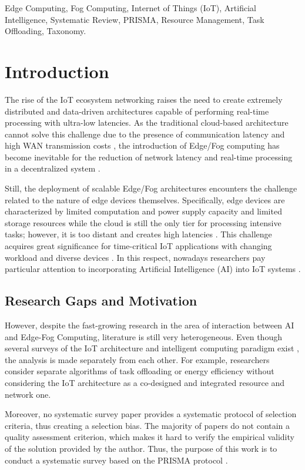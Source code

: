 \documentclass[conference]{IEEEtran}
\begin{document}
\begin{IEEEkeywords}
Edge Computing, Fog Computing, Internet of Things (IoT), Artificial Intelligence, Systematic Review, PRISMA, Resource Management, Task Offloading, Taxonomy.
\end{IEEEkeywords}

\section{Introduction}
\label{sec:intro}

The rise of the IoT ecosystem networking raises the need to create extremely distributed and data-driven architectures capable of performing real-time processing with ultra-low latencies. As the traditional cloud-based architecture cannot solve this challenge due to the presence of communication latency and high WAN transmission costs \cite{b1,b5}, the introduction of Edge/Fog computing has become inevitable for the reduction of network latency and real-time processing in a decentralized system \cite{b22,b23}.

Still, the deployment of scalable Edge/Fog architectures encounters the challenge related to the nature of edge devices themselves. Specifically, edge devices are characterized by limited computation and power supply capacity and limited storage resources while the cloud is still the only tier for processing intensive tasks; however, it is too distant and creates high latencies \cite{b6,b20}. This challenge acquires great significance for time-critical IoT applications with changing workload and diverse devices \cite{b21}. In this respect, nowadays researchers pay particular attention to incorporating Artificial Intelligence (AI) into IoT systems \cite{b4,b9}.


\subsection{Research Gaps and Motivation}
However, despite the fast-growing research in the area of interaction between AI and Edge-Fog Computing, literature is still very heterogeneous. Even though several surveys of the IoT architecture and intelligent computing paradigm exist \cite{b10,b15}, the analysis is made separately from each other. For example, researchers consider separate algorithms of task offloading \cite{b3} or energy efficiency \cite{b7} without considering the IoT architecture as a co-designed and integrated resource and network one.

Moreover, no systematic survey paper provides a systematic protocol of selection criteria, thus creating a selection bias. The majority of papers do not contain a quality assessment criterion, which makes it hard to verify the empirical validity of the solution provided by the author. Thus, the purpose of this work is to conduct a systematic survey based on the PRISMA protocol \cite{b31}.
\end{document}
